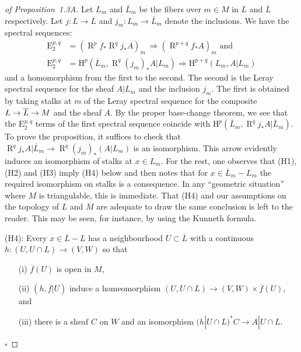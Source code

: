 \documentclass[10pt,twoside]{article}
\newcommand{\homology}{{\mathrm {H}}}
\newcommand{\derived}{{\operatorname{R}}}
\newcommand{\qed}{\nopagebreak\par\hspace*{\fill}$\square$\par\vskip2mm}
\newtheorem{proof}{Proof}
\begin{document}
\begin{proof}[of Proposition~1.3A] 
Let $L_m$ and $\overline{L}_m$ be the 
fibers over $m \in M$ in $L$ and $\overline{L}$ respectively.
 Let $j:L \to \overline{L}$ and $j_m:L_m \to \overline{L}_m$
denote the inclusions. We have the spectral sequences:
\begin{equation*}
\begin{split}
\mathrm{E}_2^{p,q}&=(\derived ^p\overline{f}_* \derived^q j_*A)_m \
\Rightarrow (\derived^{p+q}f_*A)_m \text{ and }\\
\mathrm{E}_2^{p,q}&=\homology^p (\overline{L}_m,
\derived ^q(j_m)_*A|L_m) \Rightarrow \homology^{p+q}    
(L_m,A|L_m)
\end{split}
\end{equation*}
and a homomorphism from the first to the second. The second is
the Leray spectral sequence for the sheaf $A|L_m$ and the
inclusion $j_m$. The first is obtained by taking stalks at $m$ of
the Leray spectral sequence for the composite $L \to \overline{L} \to\nolinebreak M$ 
and the sheaf $A$. By the proper base-change theorem, we see that
the $\mathrm{E}_2^{p,q}$ terms of the first spectral sequence
coincide with $\homology ^p( \overline{L}_m, \derived^q j_*A| \overline{L}_m)$.
To prove the proposition, it suffices to check that
 $\derived^qj_*A|\overline{L}_m \to 
\derived^q(j_m)_*(A|L_m)$
is an isomorphism. This arrow evidently
induces an isomorphism of stalks
at $x \in L_m$. For the rest, one observes
that (H1), (H2) and (H3) imply (H4) below and then notes that for 
$x \in \overline{L}_m -L_m$ the required 
isomorphism on stalks is a consequence. 
In any ``geometric situation''
 where $M$ is triangulable, this is immediate. That (H4)
and our assumptions on the topology of $L$ and $M$ are
adequate to draw the same conclusion is left to the reader.    
 This may be seen, for instance, by using the Kunneth formula. 

\medskip

\noindent (H4): Every $x \in \overline{L}-L$ has a neighbourhood $U\subset
\overline{L}$ with a continuous $h: (U, U\cap L) \to (V,W)$ so
that 
\begin{enumerate}
\item[{\rm (i)}] $\overline{f}(U)$ is open in $M$, 
\item[{\rm (ii)}] $(h,\overline{f}|U)$ induce a homeomorphism $(U, U\cap L) 
\to (V,W) \times \overline{f}(U)$, and 
\item[{\rm (iii)}] there is a sheaf $C$ on $W$ and an isomorphism 
$(h|U \cap L)^*C \to A|U \cap L$. 
\end{enumerate}
\qed\end{proof}
 
\end{document}
